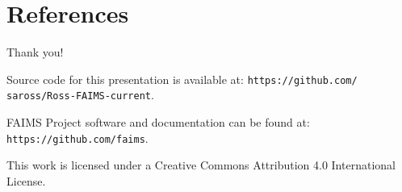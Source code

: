 \documentclass[aspectratio=169, 12pt]{beamer} %
\begin{document}
% 
 

\section{References}

  
%   
%   

\begin{multicols}{2}[]


\end{multicols}

\begin{frame}{Thank you!}


Source code for this presentation is available at: 
\texttt{https://github.com/ saross/Ross-FAIMS-current}.

FAIMS Project software and documentation can be found at:
\texttt{https://github.com/faims}.

This work is licensed under a Creative Commons Attribution 4.0 International License.

\end{frame}
\end{document}
